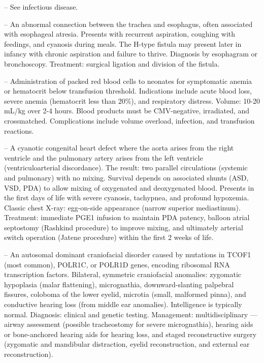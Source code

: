 -- See infectious disease.

-- An abnormal connection between the trachea and esophagus, often associated with esophageal atresia. Presents with recurrent aspiration, coughing with feedings, and cyanosis during meals. The H-type fistula may present later in infancy with chronic aspiration and failure to thrive. Diagnosis by esophagram or bronchoscopy. Treatment: surgical ligation and division of the fistula.

-- Administration of packed red blood cells to neonates for symptomatic anemia or hematocrit below transfusion threshold. Indications include acute blood loss, severe anemia (hematocrit less than 20\%), and respiratory distress. Volume: 10-20 mL/kg over 2-4 hours. Blood products must be CMV-negative, irradiated, and crossmatched. Complications include volume overload, infection, and transfusion reactions.

-- A cyanotic congenital heart defect where the aorta arises from the right ventricle and the pulmonary artery arises from the left ventricle (ventriculoarterial discordance). The result: two parallel circulations (systemic and pulmonary) with no mixing. Survival depends on associated shunts (ASD, VSD, PDA) to allow mixing of oxygenated and deoxygenated blood. Presents in the first days of life with severe cyanosis, tachypnea, and profound hypoxemia. Classic chest X-ray: egg-on-side appearance (narrow superior mediastinum). Treatment: immediate PGE1 infusion to maintain PDA patency, balloon atrial septostomy (Rashkind procedure) to improve mixing, and ultimately arterial switch operation (Jatene procedure) within the first 2 weeks of life.

-- An autosomal dominant craniofacial disorder caused by mutations in TCOF1 (most common), POLR1C, or POLR1D genes, encoding ribosomal RNA transcription factors. Bilateral, symmetric craniofacial anomalies: zygomatic hypoplasia (malar flattening), micrognathia, downward-slanting palpebral fissures, coloboma of the lower eyelid, microtia (small, malformed pinna), and conductive hearing loss (from middle ear anomalies). Intelligence is typically normal. Diagnosis: clinical and genetic testing. Management: multidisciplinary — airway assessment (possible tracheostomy for severe micrognathia), hearing aids or bone-anchored hearing aids for hearing loss, and staged reconstructive surgery (zygomatic and mandibular distraction, eyelid reconstruction, and external ear reconstruction).

